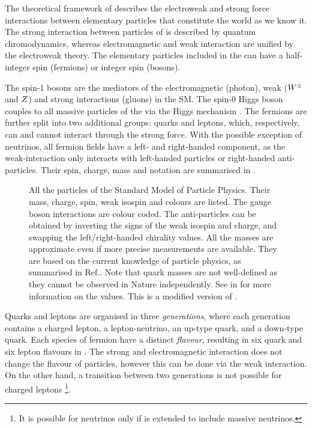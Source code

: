 The theoretical framework of \SM describes the electroweak and strong force interactions between elementary particles that constitute the world as we know it.
The strong interaction between particles of \SM is described by quantum chromodynamics, 
whereas electromagnetic and weak interaction are unified by the electroweak theory.
The elementary particles included in the \SM can have a half-integer spin (fermions) or integer spin (bosons).

The spin-1 bosons are the mediators of the electromagnetic (photon), weak ($W^\pm$ and $Z$) and strong interactions (gluons) in the SM.
The spin-0 Higgs boson couples to all massive particles of the \SM via the Higgs mechanism \cite{PhysRevLett.13.508}.
The fermions are further split into two additional groups: quarks and leptons, which, respectively, can and cannot interact through the strong force.
With the possible exception of neutrinos, all fermion fields have a left- and right-handed component, as the weak-interaction only interacts with
left-handed particles or right-handed anti-particles.
Their spin, charge, mass and notation are summarised in .
\begin{figure}[htbp!]
    \centering
    
    \caption{\label{fig:standard_model} All the particles of the Standard Model of Particle Physics.
    Their mass, charge, spin, weak isospin and colours are listed.
    The gauge boson interactions are colour coded.
    The anti-particles can be obtained by inverting the signs of the weak isospin and charge, and swapping the left/right-handed chirality values.
    All the masses are approximate even if more precise measurements are available.
    They are based on the current knowledge of particle physics, as summarised in Ref.\cite{Workman:2022ynf}.
    Note that quark masses are not well-defined as they cannot be observed in Nature independently.
    See in \cite{Workman:2022ynf} for more information on the values.
    This is a modified version of \cite{sm_diagram}.
    }
\end{figure}

Quarks and leptons are organised in three \textit{generations}, 
where each generation contains a charged lepton, a lepton-neutrino, an up-type quark, and a down-type quark.
Each species of fermion have a distinct \textit{flavour}, resulting in six quark and six lepton flavours in \SM.
The strong and electromagnetic interaction does not change the flavour of particles, 
however this can be done via the weak interaction.
On the other hand, a transition between two generations is not possible for charged leptons
\footnote{It is possible for neutrinos only if \SM is extended to include massive neutrinos.}.

